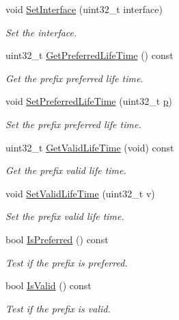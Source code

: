 \begin{DoxyCompactItemize}
void \hyperlink{classns3_1_1Ipv6AutoconfiguredPrefix_a2e08cbe9b08ad7275294fbc51b5f691d}{Set\+Interface} (uint32\+\_\+t interface)
\begin{DoxyCompactList}\small\item\em Set the interface. \end{DoxyCompactList}\item 
uint32\+\_\+t \hyperlink{classns3_1_1Ipv6AutoconfiguredPrefix_af92a80ea5e57becb8825bcd2d5b6f9ba}{Get\+Preferred\+Life\+Time} () const 
\begin{DoxyCompactList}\small\item\em Get the prefix preferred life time. \end{DoxyCompactList}\item 
void \hyperlink{classns3_1_1Ipv6AutoconfiguredPrefix_a9678f11159d174a0189407c1fea4f79a}{Set\+Preferred\+Life\+Time} (uint32\+\_\+t \hyperlink{lte__link__budget__x2__handover__measures_8m_ac9de518908a968428863f829398a4e62}{p})
\begin{DoxyCompactList}\small\item\em Set the prefix preferred life time. \end{DoxyCompactList}\item 
uint32\+\_\+t \hyperlink{classns3_1_1Ipv6AutoconfiguredPrefix_ac5b848eac3ce8039da93722979d4bd0e}{Get\+Valid\+Life\+Time} (void) const 
\begin{DoxyCompactList}\small\item\em Get the prefix valid life time. \end{DoxyCompactList}\item 
void \hyperlink{classns3_1_1Ipv6AutoconfiguredPrefix_ab95b9556327d0796e4d4d31e2a31b1c5}{Set\+Valid\+Life\+Time} (uint32\+\_\+t v)
\begin{DoxyCompactList}\small\item\em Set the prefix valid life time. \end{DoxyCompactList}\item 
bool \hyperlink{classns3_1_1Ipv6AutoconfiguredPrefix_a119183a9713c5a82a0f86d875341d91d}{Is\+Preferred} () const 
\begin{DoxyCompactList}\small\item\em Test if the prefix is preferred. \end{DoxyCompactList}\item 
bool \hyperlink{classns3_1_1Ipv6AutoconfiguredPrefix_afe6f8edaa9a728d0f0286c1b46b2c0b0}{Is\+Valid} () const 
\begin{DoxyCompactList}\small\item\em Test if the prefix is valid. \end{DoxyCompactList}\item 

\end{DoxyCompactItemize}
